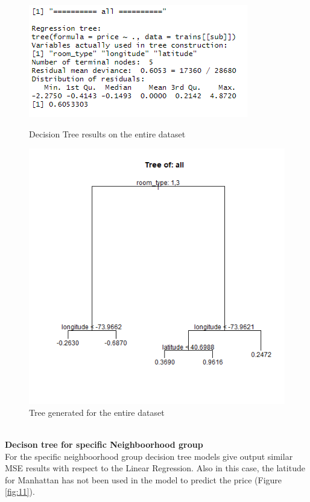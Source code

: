 \documentclass{FR16}
\begin{document}
\begin{figure}[!htb]
   \begin{minipage}{0.48\textwidth}
     \centering
     \includegraphics[width=.7\linewidth]{figures/dt.PNG} 
     \caption{Decision Tree results on the entire dataset}\label{fig:9}
   \end{minipage}\hfill
   \begin{minipage}{0.48\textwidth}
     \centering
     \includegraphics[width=.7\linewidth]{figures/tree-all.PNG}
     \caption{Tree generated for the entire dataset}\label{fig:10}
   \end{minipage}
\end{figure}


\noindent \\ \textbf{Decison tree for specific Neighboorhood group}\\
\noindent For the specific neighboorhood group decision tree models give output similar MSE results with respect to the Linear Regression. Also in this case, the latitude for Manhattan has not been used in the model to predict the price (Figure \ref{fig:11}). 
\end{document}
